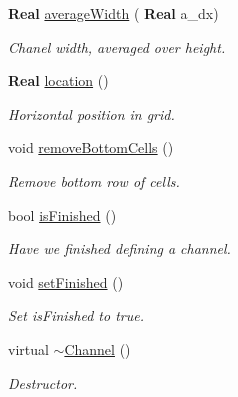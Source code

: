 \begin{DoxyCompactItemize}
\mbox{\label{class_channel_a69386c5177bdc4e2cc986e32e620e3b0}} 
\textbf{ Real} \hyperlink{class_channel_a69386c5177bdc4e2cc986e32e620e3b0}{average\+Width} (\textbf{ Real} a\+\_\+dx)
\begin{DoxyCompactList}\small\item\em Chanel width, averaged over height. \end{DoxyCompactList}\item 
\textbf{ Real} \hyperlink{class_channel_abaeb092cb3b9705a69f6c1bb26d50aa4}{location} ()
\begin{DoxyCompactList}\small\item\em Horizontal position in grid. \end{DoxyCompactList}\item 
\mbox{\label{class_channel_a4c6e4cec9b33ddbdbeade8787c3e80b6}} 
void \hyperlink{class_channel_a4c6e4cec9b33ddbdbeade8787c3e80b6}{remove\+Bottom\+Cells} ()
\begin{DoxyCompactList}\small\item\em Remove bottom row of cells. \end{DoxyCompactList}\item 
\mbox{\label{class_channel_ae46d657b8f6d3af08c2d724d6b74f360}} 
bool \hyperlink{class_channel_ae46d657b8f6d3af08c2d724d6b74f360}{is\+Finished} ()
\begin{DoxyCompactList}\small\item\em Have we finished defining a channel. \end{DoxyCompactList}\item 
\mbox{\label{class_channel_ae872e9e8559f93f901dd0d54e3014d6f}} 
void \hyperlink{class_channel_ae872e9e8559f93f901dd0d54e3014d6f}{set\+Finished} ()
\begin{DoxyCompactList}\small\item\em Set is\+Finished to true. \end{DoxyCompactList}\item 
\mbox{\label{class_channel_a5f15ebd302464069f1a9e3f0ded14482}} 
virtual \hyperlink{class_channel_a5f15ebd302464069f1a9e3f0ded14482}{$\sim$\+Channel} ()
\begin{DoxyCompactList}\small\item\em Destructor. \end{DoxyCompactList}\end{DoxyCompactItemize}

